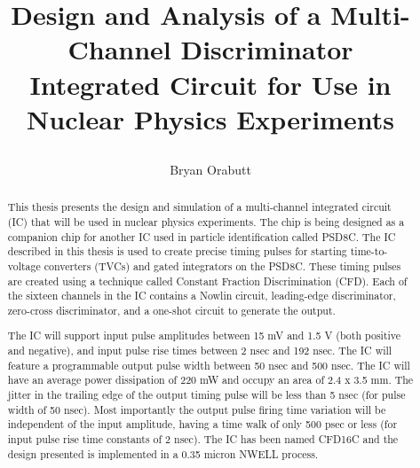\documentclass[12pt,oneside,final]{siuethesis}
\author{Bryan Orabutt}
\title{\protect\parbox{\textwidth}{\protect\centering Design and Analysis of a Multi-Channel Discriminator\protect\\ Integrated Circuit for Use in Nuclear Physics Experiments}}
\theoremstyle{definition}
\begin{document}
\maketitle 

\frontmatter %

\copyrightpage %


\begin{abstract}

\par This thesis presents the design and simulation of a multi-channel integrated circuit (IC) that will be used in nuclear physics experiments. The chip is being designed as a companion chip for another IC used in particle identification called PSD8C. The IC described in this thesis is used to create precise timing pulses for starting time-to-voltage converters (TVCs) and gated integrators on the PSD8C. These timing pulses are created using a technique called Constant Fraction Discrimination (CFD). Each of the sixteen channels in the IC contains a Nowlin circuit, leading-edge discriminator, zero-cross discriminator, and a one-shot circuit to generate the output. 
\par The IC will support input pulse amplitudes between 15 mV and 1.5 V (both positive and negative), and input pulse rise times between 2 nsec and 192 nsec. The IC will feature a programmable output pulse width between 50 nsec and 500 nsec. The IC will have an average power dissipation of 220 mW and occupy an area of 2.4 x 3.5 mm. The jitter in the trailing edge of the output timing pulse will be less than 5 nsec (for pulse width of 50 nsec). Most importantly the output pulse firing time variation will be independent of the input amplitude, having a time walk of only 500 psec or less (for input pulse rise time constants of 2 nsec). The IC has been named CFD16C and the design presented is implemented in a 0.35 micron NWELL process.
\end{abstract}


\end{document}
